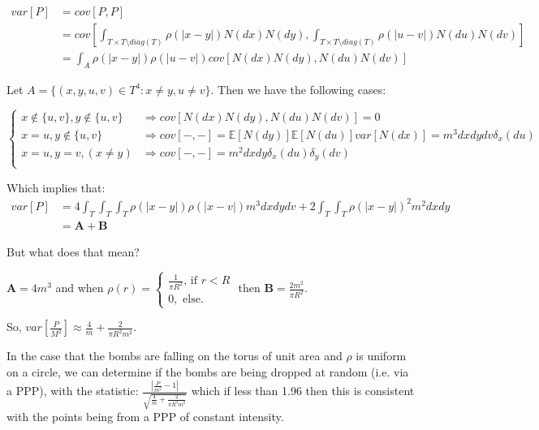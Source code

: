 \documentclass[12pt]{article}
\begin{document}
    $$\begin{aligned}
    var[P] &= cov[P,P] \\
    &= cov[\int_{T\times T \setminus diag(T)}\rho(|x-y|) N(dx)N(dy), \int_{T\times T \setminus diag(T)}\rho(|u-v|)N(du)N(dv)] \\ 
    &= \int_A\rho(|x-y|)\rho(|u-v|) cov[N(dx)N(dy),N(du)N(dv)]
    \end{aligned}$$
    
    Let $A=\{(x,y,u,v) \in T^4 : x\neq y, u\neq v \}$. Then we have the following cases:
    
    $$\begin{cases}
    x\notin \{u,v\}, y\notin \{u,v\} &\Rightarrow cov[N(dx) N(dy), N(du)N(dv)] = 0\\
    x=u, y\notin\{u,v\} 		  &\Rightarrow cov[-,-] = \mathbb{E}[N(dy)]\mathbb{E}[N(du)]var[N(dx)] = m^3dxdydv\delta_x(du)\\
    x=u,y=v, (x\neq y)		  &\Rightarrow cov[-,-] = m^2dxdy \delta_x(du)\delta_y(dv)\\
    \end{cases}$$
    
    Which implies that:
    \
    $$\begin{aligned}
    var[P] &= 4\int_T \int_T\int_T \rho (|x-y|) \rho(|x-v|)m^3 dxdydv + 2\int_T\int_T\rho (|x-y|)^2 m^2dxdy\\
        &= \mathbf{A} + \mathbf{B}
    \end{aligned}$$
    
    But what does that mean?
    
    $\mathbf{A} = 4m^3$ and when $\rho(r) = \begin{cases} \frac{1}{\pi R^2} \text{, if } r<R  \\  0, \text{  else.} \end{cases}$ then  $\mathbf{B}=\frac{2m^2}{\pi R^2}$.
    
    So, $var[\frac{P}{M^2}] \approx \frac{4}{m} + \frac{2}{\pi R^2 m^2} $.
    
    In the case that the bombs are falling on the torus of unit area and $\rho$ is uniform on a circle, we can determine if the bombs are being dropped at random (i.e. via a PPP), with the statistic:
    $
    \frac{| \frac{P}{m^2} - 1 |} {\sqrt{ \frac{4}{m} + \frac{2}{\pi R^2 m^2} }}$ which if less than 1.96 then this is consistent with the points being from a PPP of constant intensity.
    
    
\end{document}
